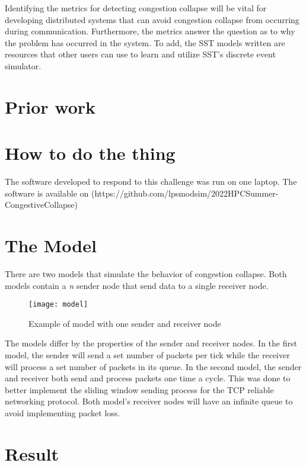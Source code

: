 \documentclass{article}
\begin{document}
Identifying the metrics for detecting congestion collapse will be vital for developing distributed systems that can avoid congestion collapse from occurring during communication. Furthermore, the metrics answer the question as to why the problem has occurred in the system. To add, the SST models written are resources that other users can use to learn and utilize SST's discrete event simulator.

\section{Prior work} %


\section{How to do the thing}

The software developed to respond to this challenge was run on one laptop.
The software is available on (https://github.com/lpsmodsim/2022HPCSummer-CongestiveCollapse)

\section{The Model}

There are two models that simulate the behavior of congestion collapse.
Both models contain a \textit{n} sender node that send data to a single receiver node.

\begin{figure}[H]
	\texttt{[image: model]}
	\centering
	\caption{Example of model with one sender and receiver node}
\end{figure}

The models differ by the properties of the sender and receiver nodes.
In the first model, the sender will send a set number of packets per tick while the receiver will process a set number of packets in its queue.
In the second model, the sender and receiver both send and process packets one time a cycle. This was done to better implement the sliding window sending process for the TCP reliable networking protocol.
Both model's receiver nodes will have an infinite queue to avoid implementing packet loss.

\section{Result} %
\end{document}
